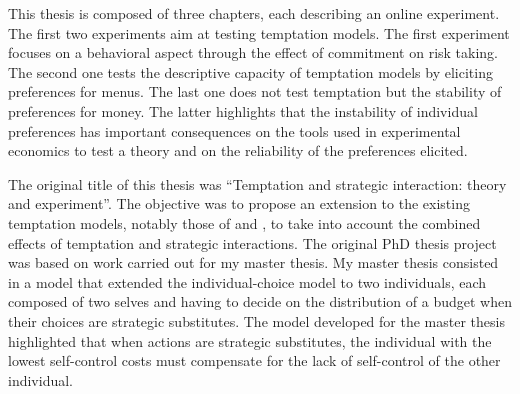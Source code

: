 \documentclass[
]{book}
\begin{document}
This thesis is composed of three chapters, each describing an online experiment.
The first two experiments aim at testing temptation models.
The first experiment focuses on a behavioral aspect through the effect of commitment on risk taking.
The second one tests the descriptive capacity of temptation models by eliciting
preferences for menus.
The last one does not test temptation but the stability of preferences for money.
The latter highlights that the instability of individual preferences has
important consequences on the tools used in experimental economics to test a
theory and on the reliability of the preferences elicited.

The original title of this thesis was ``Temptation and strategic interaction:
theory and experiment''.
The objective was to propose an extension to the existing temptation models,
notably those of \citet{gul2001temptation} and \citet{fudenberg2006dual}, to take into account the combined effects of temptation and strategic interactions.
The original PhD thesis project was based on work carried out for my master thesis.
My master thesis consisted in a model that extended the \citet{fudenberg2006dual} individual-choice model to two individuals, each composed of two selves and having to decide on the distribution of a budget when their choices
are strategic substitutes.
The model developed for the master thesis highlighted that when actions are strategic substitutes, the
individual with the lowest self-control costs must compensate for the lack of
self-control of the other individual.
\end{document}
